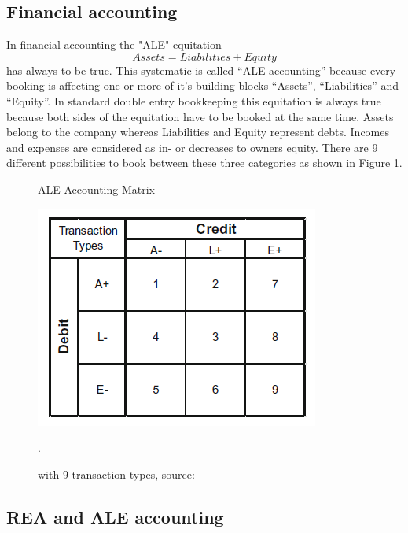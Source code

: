 
\subsection*{Financial accounting}

In financial accounting the "ALE" equitation $$ Assets = Liabilities + Equity $$ has always to be true.
This systematic is called ``ALE accounting'' because every booking is affecting one or more of it's building blocks ``Assets'', ``Liabilities'' and ``Equity''. \cite{schwaiger2015aleandrea}
In standard double entry bookkeeping this equitation is always true because both sides of the equitation have to be booked at the same time.
Assets belong to the company whereas Liabilities and Equity represent debts.
Incomes and expenses are considered as in- or decreases to owners equity. \cite{horngren2006introduction}
There are 9 different possibilities to book between these three categories as shown in Figure \ref{fig:ale-accounting---schwaiger}.

\begin{figure}
	\centering
	\caption{ALE Accounting Matrix}
	\label{fig:ale-accounting---schwaiger}
	\includegraphics[width=0.4\linewidth]{"../figures/ALE Accounting - Schwaiger"}
	\caption*{with 9 transaction types, source: \cite{schwaiger2015aleandrea}}.
\end{figure}

\subsection*{REA and ALE accounting}

